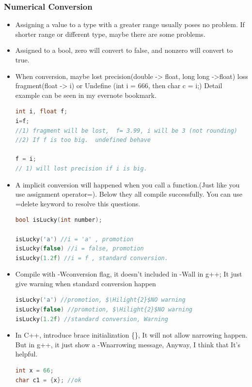 \documentclass[a4paper,12pt,twoside]{book}
\newcommand{\Hilight}[1]{\makebox[0pt][l]{\color{yellow}\rule[-3pt]{#1em}{11pt}}}
\begin{document}
\subsubsection{Numerical Conversion}
\begin{itemize}
\item Assigning a value to a type with a greater range usually poses no problem. If shorter range or different type, maybe there are some problems.
\item Assigned to a bool, zero will convert to false, and nonzero will convert to true.
\item When conversion, maybe lost precision(double -> float, long long ->float) loss fragment(float -> i) or Undefine (int i = 666, then char c = i;)
Detail example can be seen in my evernote bookmark.
\begin{lstlisting}[frame=single, language=c++]
int i, float f;
i=f;
//1) fragment will be lost,  f= 3.99, i will be 3 (not rounding)
//2) If f is too big.  undefined behave

f = i;
// 1) will lost precision if i is big.
\end{lstlisting}

\item A implicit conversion will happened when you call a function.(Just like you use assignment operator=). Below they all compile successfully. You can use =delete keyword to resolve this questions.
\begin{lstlisting}[frame=single, language=c++]
bool isLucky(int number);

isLucky('a') //i = 'a' , promotion
isLucky(false) //i = false, promotion
isLucky(1.2f) //i = f , standard conversion.
\end{lstlisting}

\item Compile with -Wconversion flag, it doesn't included in -Wall in g++; It just give warning when standard conversion happen

\begin{lstlisting}[frame=single, language=c++, mathescape=true]
isLucky('a') //promotion, $\Hilight{2}$NO warning
isLucky(false) //promotion, $\Hilight{2}$NO warning
isLucky(1.2f) //standard conversion, Warning
\end{lstlisting}

\item In C++, introduce brace initialization \{\}, It will not allow narrowing happen. But in g++, it just show a -Wnarrowing message, Anyway, I think that It's helpful.
\begin{lstlisting}[frame=single, language=c++]
int x = 66;
char c1 = {x}; //ok


\end{lstlisting}
\end{itemize}
\end{document}
